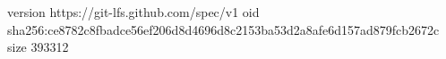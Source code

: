 version https://git-lfs.github.com/spec/v1
oid sha256:ce8782c8fbadce56ef206d8d4696d8c2153ba53d2a8afe6d157ad879fcb2672c
size 393312
